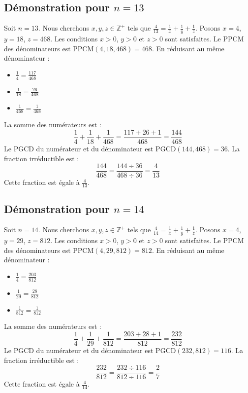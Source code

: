 \documentclass[11pt,a4paper]{article}
\begin{document}
\subsection{Démonstration pour $n = 13$}
Soit $n = 13$. Nous cherchons $x, y, z \in \mathbb{Z}^{+}$ tels que $\frac{4}{13} = \frac{1}{x} + \frac{1}{y} + \frac{1}{z}$.
Posons $x = 4$, $y = 18$, $z = 468$.
Les conditions $x > 0$, $y > 0$ et $z > 0$ sont satisfaites.
Le PPCM des dénominateurs est $\text{PPCM}(4, 18, 468) = 468$.
En réduisant au même dénominateur :
\begin{itemize}
    \item $\frac{1}{4} = \frac{117}{468}$
    \item $\frac{1}{18} = \frac{26}{468}$
    \item $\frac{1}{468} = \frac{1}{468}$
\end{itemize}
La somme des numérateurs est :
$$ \frac{1}{4} + \frac{1}{18} + \frac{1}{468} = \frac{117 + 26 + 1}{468} = \frac{144}{468} $$
Le PGCD du numérateur et du dénominateur est $\text{PGCD}(144, 468) = 36$.
La fraction irréductible est :
$$ \frac{144}{468} = \frac{144 \div 36}{468 \div 36} = \frac{4}{13} $$
Cette fraction est égale à $\frac{4}{13}$.

\subsection{Démonstration pour $n = 14$}
Soit $n = 14$. Nous cherchons $x, y, z \in \mathbb{Z}^{+}$ tels que $\frac{4}{14} = \frac{1}{x} + \frac{1}{y} + \frac{1}{z}$.
Posons $x = 4$, $y = 29$, $z = 812$.
Les conditions $x > 0$, $y > 0$ et $z > 0$ sont satisfaites.
Le PPCM des dénominateurs est $\text{PPCM}(4, 29, 812) = 812$.
En réduisant au même dénominateur :
\begin{itemize}
    \item $\frac{1}{4} = \frac{203}{812}$
    \item $\frac{1}{29} = \frac{28}{812}$
    \item $\frac{1}{812} = \frac{1}{812}$
\end{itemize}
La somme des numérateurs est :
$$ \frac{1}{4} + \frac{1}{29} + \frac{1}{812} = \frac{203 + 28 + 1}{812} = \frac{232}{812} $$
Le PGCD du numérateur et du dénominateur est $\text{PGCD}(232, 812) = 116$.
La fraction irréductible est :
$$ \frac{232}{812} = \frac{232 \div 116}{812 \div 116} = \frac{2}{7} $$
Cette fraction est égale à $\frac{4}{14}$.
\end{document}
